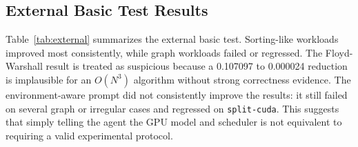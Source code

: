 \documentclass[conference]{IEEEtran}
\begin{document}
\subsection{External Basic Test Results}

Table~\ref{tab:external} summarizes the external basic test. Sorting-like workloads improved most consistently, while graph workloads failed or regressed. The Floyd-Warshall result is treated as suspicious because a 0.107097 to 0.000024 reduction is implausible for an $O(N^3)$ algorithm without strong correctness evidence. The environment-aware prompt did not consistently improve the results: it still failed on several graph or irregular cases and regressed on \texttt{split-cuda}. This suggests that simply telling the agent the GPU model and scheduler is not equivalent to requiring a valid experimental protocol.

\begin{table}[t]
\centering
\caption{External basic test results. Times are from the provided summary; raw logs and diffs are N/A.}
\label{tab:external}
\footnotesize
{}
\end{table}
\end{document}
